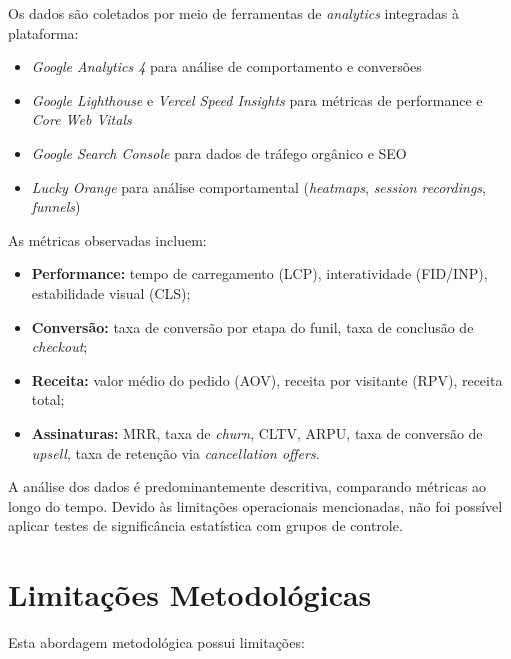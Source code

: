 Os dados são coletados por meio de ferramentas de \textit{analytics} integradas à plataforma:

\begin{itemize}
    \item \textit{Google Analytics 4} para análise de comportamento e conversões
    \item \textit{Google Lighthouse} e \textit{Vercel Speed Insights} para métricas de performance e \textit{Core Web Vitals}
    \item \textit{Google Search Console} para dados de tráfego orgânico e SEO
    \item \textit{Lucky Orange} para análise comportamental (\textit{heatmaps}, \textit{session recordings}, \textit{funnels})
\end{itemize}

As métricas observadas incluem:

\begin{itemize}
    \item \textbf{Performance:} tempo de carregamento (LCP), interatividade (FID/INP), estabilidade visual (CLS);
    \item \textbf{Conversão:} taxa de conversão por etapa do funil, taxa de conclusão de \textit{checkout};
    \item \textbf{Receita:} valor médio do pedido (AOV), receita por visitante (RPV), receita total;
    \item \textbf{Assinaturas:} MRR, taxa de \textit{churn}, CLTV, ARPU, taxa de conversão de \textit{upsell}, taxa de retenção via \textit{cancellation offers}.
\end{itemize}

A análise dos dados é predominantemente descritiva, comparando métricas ao longo do tempo. Devido às limitações operacionais mencionadas, não foi possível aplicar testes de significância estatística com grupos de controle.

\section{Limitações Metodológicas}

Esta abordagem metodológica possui limitações:

